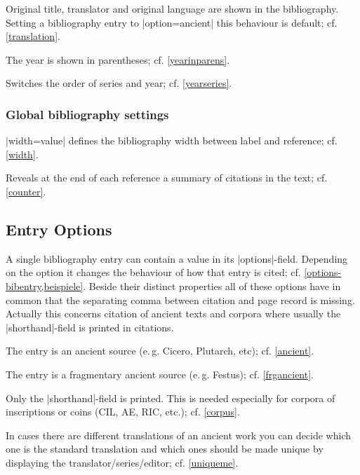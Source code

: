 \documentclass[a4paper,
10pt,
greek,
french,
spanish,
italian,
ngerman,
english,
]{ltxdoc}
\begin{document}
Original title, translator and original language are shown in the bibliography. 
Setting a bibliography entry to |option={ancient}| this behaviour is default; cf. \cref{translation}. 

The year is shown in parentheses; cf. \cref{yearinparens}.

Switches the order of series and year; cf. \cref{yearseries}.
 
\subsubsection{Global bibliography settings}

|width={value}| defines the bibliography width between label and reference; cf. \cref{width}.

Reveals at the end of each reference a summary of citations in the text; cf. \cref{counter}.

\subsection{Entry Options}
A single bibliography entry can contain a value in its |options|-field.
Depending on the option it changes the behaviour of how that entry is cited; cf. \cref{options-bibentry,beispiele}. 
Beside their distinct properties all of these options have in common that the separating comma between citation and page record is missing. 
Actually this concerns citation of ancient texts and corpora where usually the |shorthand|-field is printed in citations.

The entry is an ancient source (e.\,g. Cicero, Plutarch, etc); cf. \cref{ancient}.

The entry is a fragmentary ancient source (e.\,g. Festus); cf. \cref{frgancient}.

Only the |shorthand|-field is printed.
This is needed especially for corpora of inscriptions or coins (CIL, AE, RIC, etc.); cf. \cref{corpus}.

In cases there are different translations of an ancient work you can decide which one is the standard translation and which ones should be made unique by displaying the translator/series/editor; cf. \cref{uniqueme}.

\end{document}
